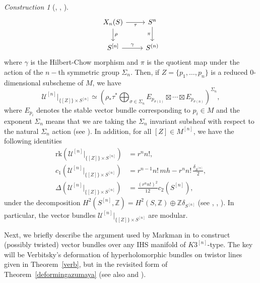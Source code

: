 \documentclass[12pt,a4paper]{amsart}
\theoremstyle{plain}
\theoremstyle{definition}
\theoremstyle{remark}
\newtheorem{construction}[thm]{Construction}
\def\H{H}
\newcommand{\ZZ}{\mathbb{Z}}
\newcommand{\rk}{\mathrm{rk}}
\newcommand{\cc}{c}
\begin{document}
\begin{construction}[{{\cite[Section 4]{ogrady-moduli-sheaves-hk}, \cite[Section 11]{markmanstable}, \cite[Section 7]{markman}}}]
\[\begin{tikzcd}
	{X_n(S)} & {S^n} \\
	{S^{[n]}} & {S^{(n)}}
	\arrow["\tau"', from=1-1, to=1-2]
	\arrow["\rho", from=1-1, to=2-1]
	\arrow["\pi"', from=1-2, to=2-2]
	\arrow["\gamma", from=2-1, to=2-2]
\end{tikzcd}\]
    where $\gamma$ is the Hilbert-Chow morphism and $\pi$ is the quotient map under the action of the $n-$th symmetric group $\Sigma_n$. Then, if $Z=\{p_1,\dots,p_n\}$ is a reduced $0$-dimensional subscheme of $M$, we have
    \[
    {\mathcal{U}^{[n]}}|_{\{[Z]\}\times S^{[n]}}\simeq \left(\rho_*\tau^*\bigoplus_{\sigma\in\Sigma_n}E_{p_{\sigma(1)}}\boxtimes\cdots\boxtimes E_{p_{\sigma(n)}}\right)^{\Sigma_n},
    \]
    where $E_{p_i}$ denotes the stable vector bundle corresponding to $p_i\in M$ and the exponent $\Sigma_n$ means that we are taking the $\Sigma_n$ invariant subsheaf with respect to the natural $\Sigma_n$ action (see \cite[Example 3.2.10]{ogrady-moduli-sheaves-hk}).
    In addition, for all $[Z]\in M^{[n]}$, we have the following identities
\begin{align}
\rk\!\left({\mathcal{U}^{[n]}}|_{\{[Z]\}\times S^{[n]}}\right)
    &= r^n n!, \label{rank1}\\
\cc_1\!\left({\mathcal{U}^{[n]}}|_{\{[Z]\}\times S^{[n]}}\right)
    &= r^{n-1}n! \, m h
       - r^n n! \, \frac{\delta_{S^{[n]}}}{2}, \label{c11}\\
\Delta\!\left({\mathcal{U}^{[n]}}|_{\{[Z]\}\times S^{[n]}}\right)
    &= \frac{(r^n n!)^2}{12}\cc_2(S^{[n]}), \label{eq_modularity1}
\end{align}
    under the decomposition  $\H^2(S^{[n]},\ZZ)=\H^2(S,\ZZ)\oplus \ZZ\delta_{S^{[n]}}$ (see \cite[Lemma 11.1]{markmanstable}, \cite[Example 3.2.10]{ogrady-moduli-sheaves-hk}, \cite[Remark 2.10]{OGrady2026}).
    In particular, the vector bundles ${\mathcal{U}^{[n]}}|_{\{[Z]\}\times S^{[n]}}$ are modular.
    \end{construction}
    
Next, we briefly describe the argument used by Markman in \cite[Theorem 8.4]{markman} to construct (possibly twisted) vector bundles over any IHS manifold of $K3^{[n]}$-type.
The key will be Verbitsky's deformation of hyperholomorphic bundles on twistor lines given in Theorem~\ref{verb}, but in the revisited form of Theorem~\ref{deformingazumaya} (see also \cite[Proposition 5.22]{markman} and \cite[Proposition 5.15]{markman}).
\end{document}
